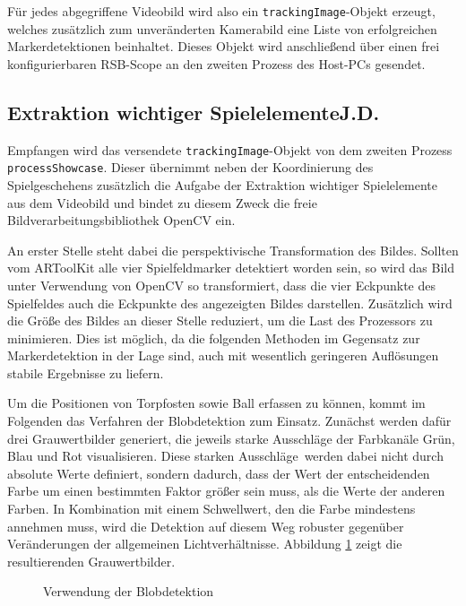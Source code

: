 Für jedes abgegriffene Videobild wird also ein \texttt{trackingImage}-Objekt erzeugt, welches zusätzlich zum unveränderten Kamerabild eine Liste von erfolgreichen Markerdetektionen beinhaltet. Dieses Objekt wird anschließend über einen frei konfigurierbaren RSB-Scope an den zweiten Prozess des Host-PCs gesendet.

\subsection[Extraktion wichtiger Spielelemente]{Extraktion wichtiger Spielelemente\hfill {\normalsize J.D.}} %

Empfangen wird das versendete \texttt{trackingImage}-Objekt von dem zweiten Prozess \texttt{processShowcase}. Dieser übernimmt neben der Koordinierung des Spielgeschehens zusätzlich die Aufgabe der Extraktion wichtiger Spielelemente aus dem Videobild und bindet zu diesem Zweck die freie Bildverarbeitungsbibliothek OpenCV ein.

An erster Stelle steht dabei die perspektivische Transformation des Bildes. Sollten vom ARToolKit alle vier Spielfeldmarker detektiert worden sein, so wird das Bild unter Verwendung von OpenCV so transformiert, dass die vier Eckpunkte des Spielfeldes auch die Eckpunkte des angezeigten Bildes darstellen. Zusätzlich wird die Größe des Bildes an dieser Stelle reduziert, um die Last des Prozessors zu minimieren. Dies ist möglich, da die folgenden Methoden im Gegensatz zur Markerdetektion in der Lage sind, auch mit wesentlich geringeren Auflösungen stabile Ergebnisse zu liefern.

Um die Positionen von Torpfosten sowie Ball erfassen zu können, kommt im Folgenden das Verfahren der Blobdetektion zum Einsatz. Zunächst werden dafür drei Grauwertbilder generiert, die jeweils starke Ausschläge der Farbkanäle Grün, Blau und Rot visualisieren. Diese \glqq starken Ausschläge\grqq~werden dabei nicht durch absolute Werte definiert, sondern dadurch, dass der Wert der entscheidenden Farbe um einen bestimmten Faktor größer sein muss, als die Werte der anderen Farben. In Kombination mit einem Schwellwert, den die Farbe mindestens annehmen muss, wird die Detektion auf diesem Weg robuster gegenüber Veränderungen der allgemeinen Lichtverhältnisse. Abbildung \ref{fig:blob} zeigt die resultierenden Grauwertbilder.

\begin{figure}
	\begin{center}
		\caption{Verwendung der Blobdetektion}
		\label{fig:blob}
	\end{center}
\end{figure}

